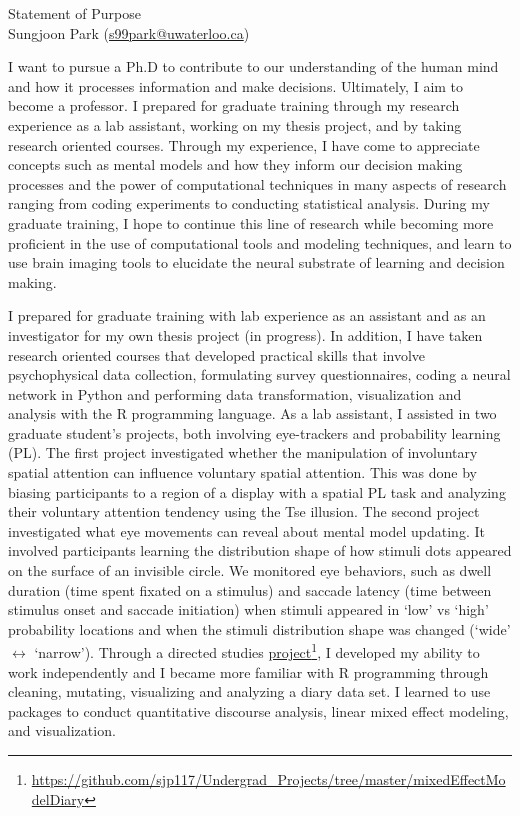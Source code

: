 \documentclass[12pt]{article}
\let\oldcenter\center
\let\oldendcenter\endcenter
\renewenvironment{center}{\setlength\topsep{-1pt}\oldcenter}{\oldendcenter}
\begin{document}
	
	\begin{center}
		{\Large Statement of Purpose} \\
		{\normalsize Sungjoon Park (\href{mailto:s99park@uwaterloo.ca}{s99park@uwaterloo.ca})}
	\end{center}
	
	I want to pursue a Ph.D to contribute to our understanding of the human mind and how it processes information and make decisions. Ultimately, I aim to become a professor. I prepared for graduate training through my research experience as a lab assistant, working on my thesis project, and by taking research oriented courses. Through my experience, I have come to appreciate concepts such as mental models and how they inform our decision making processes and the power of computational techniques in many aspects of research ranging from coding experiments to conducting statistical analysis. During my graduate training, I hope to continue this line of research while becoming more proficient in the use of computational tools and modeling techniques, and learn to use brain imaging tools to elucidate the neural substrate of learning and decision making.

	I prepared for graduate training with lab experience as an assistant and as an investigator for my own thesis project (in progress). In addition, I have taken research oriented courses that developed practical skills that involve psychophysical data collection, formulating survey questionnaires, coding a neural network in Python and performing data transformation, visualization and analysis with the R programming language. As a lab assistant, I assisted in two graduate student's projects, both involving eye-trackers and probability learning (PL). The first project investigated whether the manipulation of involuntary spatial attention can influence voluntary spatial attention. This was done by biasing participants to a region of a display with a spatial PL task and analyzing their voluntary attention tendency using the Tse illusion. The second project investigated what eye movements can reveal about mental model updating. It involved participants learning the distribution shape of how stimuli dots appeared on the surface of an invisible circle. We monitored eye behaviors, such as dwell duration (time spent fixated on a stimulus) and saccade latency (time between stimulus onset and saccade initiation) when stimuli appeared in `low' vs `high' probability locations and when the stimuli distribution shape was changed (`wide' $\leftrightarrow$ `narrow'). Through a directed studies \href{https://github.com/sjp117/Undergrad_Projects/tree/master/mixedEffectModelDiary}{project}\footnote{\url{https://github.com/sjp117/Undergrad\_Projects/tree/master/mixedEffectModelDiary}}, I developed my ability to work independently and I became more familiar with R programming through cleaning, mutating, visualizing and analyzing a diary data set. I learned to use packages to conduct quantitative discourse analysis, linear mixed effect modeling, and visualization.
\end{document}
